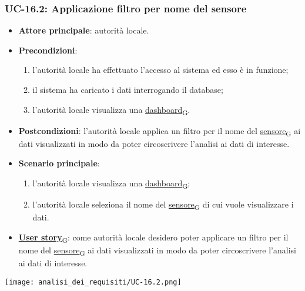 \newpage
\subsubsection{UC-16.2: Applicazione filtro per nome del sensore}
\begin{itemize}
	\item \textbf{Attore principale}: autorità locale.
	\item \textbf{Precondizioni}:
	      \begin{enumerate}
		      \item l'autorità locale ha effettuato l'accesso al sistema ed esso è in funzione;
		      \item il sistema ha caricato i dati interrogando il database;
		      \item l'autorità locale visualizza una \href{https://7last.github.io/docs/pb/documentazione-interna/glossario\#dashboard}{dashboard\textsubscript{G}}.
	      \end{enumerate}
	\item \textbf{Postcondizioni}: l'autorità locale applica un filtro per il nome del \href{https://7last.github.io/docs/pb/documentazione-interna/glossario\#sensore}{sensore\textsubscript{G}} ai dati visualizzati in modo da poter circoscrivere l'analisi ai dati di interesse.
	\item \textbf{Scenario principale}:
	      \begin{enumerate}
		      \item l'autorità locale visualizza una \href{https://7last.github.io/docs/pb/documentazione-interna/glossario\#dashboard}{dashboard\textsubscript{G}};
		      \item l'autorità locale seleziona il nome del \href{https://7last.github.io/docs/pb/documentazione-interna/glossario\#sensore}{sensore\textsubscript{G}} di cui vuole visualizzare i dati.
	      \end{enumerate}
	\item \href{https://7last.github.io/docs/pb/documentazione-interna/glossario\#user-story}{\textbf{User story}\textsubscript{G}}:
	      come autorità locale desidero poter applicare un filtro per il nome del \href{https://7last.github.io/docs/pb/documentazione-interna/glossario\#sensore}{sensore\textsubscript{G}} ai dati visualizzati in modo da poter circoscrivere l'analisi ai dati di interesse.
\end{itemize}
\begin{center}
	\texttt{[image: analisi\_dei\_requisiti/UC-16.2.png]}
\end{center}

